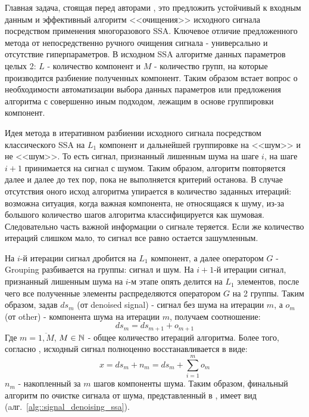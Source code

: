 Главная задача, стоящая перед авторами \cite{kuang2020efficient}, это предложить устойчивый к входным данным  и эффективный алгоритм <<очищения>> исходного сигнала посредством применения многоразового SSA. Ключевое отличие предложенного метода от непосредственно ручного очищения сигнала - универсально и отсутствие гиперпараметров. В исходном SSA алгоритме данных параметров целых 2: $L$ - количество компонент и $M$ - количество групп, на которые производится разбиение полученных компонент. Таким образом встает вопрос о необходимости автоматизации выбора данных параметров или предложения алгоритма с совершенно иным подходом, лежащим в основе группировки компонент.

Идея метода в итеративном разбиении исходного сигнала посредством классического SSA на $L_1$ компонент и дальнейшей группировке на <<шум>> и не <<шум>>.  То есть сигнал, признанный лишенным шума на шаге  $i$, на шаге $i + 1$ принимается на сигнал с шумом. Таким образом, алгоритм повторяется далее и далее до тех пор, пока не выполняется критерий останова. В случае отсутствия оного исход алгоритма упирается в количество заданных итераций: возможна ситуация, когда важная компонента, не относящаяся к шуму, из-за большого количество шагов алгоритма классифицируется как шумовая. Следовательно часть важной информации о сигнале теряется. Если же количество итераций слишком мало, то сигнал все равно остается зашумленным.

На $i$-й итерации сигнал дробится на $L_1$ компонент, а далее оператором $G$ - Grouping разбивается на группы: сигнал и шум. На $i + 1$-й итерации сигнал, признанный лишенным шума на $i$-м этапе опять делится на $L_1$ элементов, после чего все полученные элементы распределяются оператором $G$ на 2 группы. Таким образом, задав $ds_m$ (от denoised signal) - сигнал без шума на итерации $m$, а $o_m$ (от other) - компонента шума на итерации $m$, получаем соотношение:
\begin{equation}
	ds_m = ds_{m + 1} + o_{m + 1}
\end{equation}
Где $m = \overline{1, M}$, $M \in \mathbb{N}$ - общее количество итераций алгоритма. Более того, согласно \cite{kuang2020efficient}, исходный сигнал полноценно восстанавливается в виде:
\begin{equation}
	x = ds_m + n_m = ds_m + \sum_{i = 1}^m o_m
\end{equation}
$n_m$ - накопленный за $m$ шагов компоненты шума. Таким образом, финальный алгоритм по очистке сигнала от шума, представленный в \cite{kuang2020efficient}, имеет вид (aлг.~\ref{alg::signal_denoising_ssa}). 

